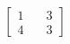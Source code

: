 \documentclass[preview]{standalone}
\begin{document}
\begin{align*}
\begin{bmatrix} 1 & \quad 3 \\ 4 & \quad 3 \end{bmatrix}
\end{align*}
\end{document}
